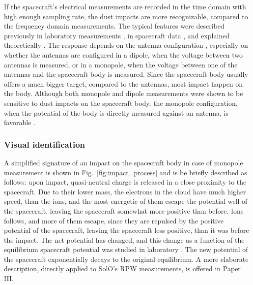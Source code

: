 If the spacecraft's electrical measurements are recorded in the time domain with high enough sampling rate, the dust impacts are more recognizable, compared to the frequency domain measurements. The typical features were described previously in laboratory measurements \citep{auer1968,nouzak2018laboratory,shen2021laboratory,shen2023variability}, in spacecraft data \citep{zaslavsky2012interplanetary,kellogg2016dust,vaverka2021ion}, and explained theoretically \citep{zaslavsky2015floating,meyer2017frequency,shen2021electrostatic,babic2022analytical}. The response depends on the antenna configuration \citep{shen2023variability,vaverka2021ion}, especially on whether the antennas are configured in a dipole, when the voltage between two antennas is measured, or in a monopole, when the voltage between one of the antennas and the spacecraft body is measured. Since the spacecraft body usually offers a much bigger target, compared to the antennas, most impact happen on the body. Although both monopole and dipole measurements were shown to be sensitive to dust impacts on the spacecraft body, the monopole configuration, when the potential of the body is directly measured against an antenna, is favorable \citep{meyer2014importance,mann2019dust}. 

\subsubsection{Visual identification}

A simplified signature of an impact on the spacecraft body in case of monopole measurement is shown in Fig.~\ref{fig:impact_process} and is be briefly described as follows: upon impact, quasi-neutral charge is released in a close proximity to the spacecraft. Due to their lower mass, the electrons in the cloud have much higher speed, than the ions, and the most energetic of them escape the potential well of the spacecraft, leaving the spacecraft somewhat more positive than before. Ions follows, and more of them escape, since they are repulsed by the positive potential of the spacecraft, leaving the spacecraft less positive, than it was before the impact. The net potential has changed, and this change as a function of the equilibrium spacecraft potential was studied in laboratory \citep{collette2016characteristic,kovcivsvcak2020effective}. The new potential of the spacecraft exponentially decays to the original equilibrium. A more elaborate description, directly applied to SolO's RPW measurements, is offered in Paper III.

